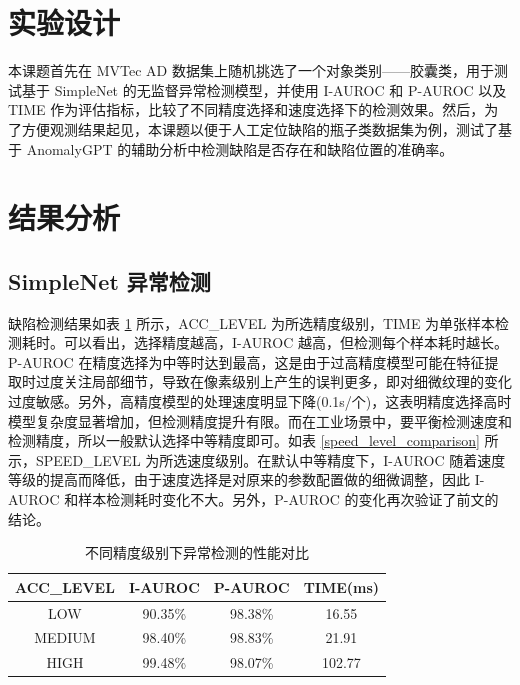 \documentclass[
  ]{njuthesis}
\begin{document}
\section{实验设计}

本课题首先在 MVTec AD 数据集上随机挑选了一个对象类别——胶囊类，用于测试基于 SimpleNet 的无监督异常检测模型，并使用 I-AUROC 和 P-AUROC 以及 TIME 作为评估指标，比较了不同精度选择和速度选择下的检测效果。然后，为了方便观测结果起见，本课题以便于人工定位缺陷的瓶子类数据集为例，测试了基于 AnomalyGPT 的辅助分析中检测缺陷是否存在和缺陷位置的准确率。

\section{结果分析}

\subsection{SimpleNet 异常检测}

缺陷检测结果如表 \ref{acc_level_comparison} 所示，ACC\_LEVEL 为所选精度级别，TIME 为单张样本检测耗时。可以看出，选择精度越高，I-AUROC 越高，但检测每个样本耗时越长。P-AUROC 在精度选择为中等时达到最高，这是由于过高精度模型可能在特征提取时过度关注局部细节，导致在像素级别上产生的误判更多，即对细微纹理的变化过度敏感。另外，高精度模型的处理速度明显下降(0.1s/个)，这表明精度选择高时模型复杂度显著增加，但检测精度提升有限。而在工业场景中，要平衡检测速度和检测精度，所以一般默认选择中等精度即可。如表 \ref{speed_level_comparison} 所示，SPEED\_LEVEL 为所选速度级别。在默认中等精度下，I-AUROC 随着速度等级的提高而降低，由于速度选择是对原来的参数配置做的细微调整，因此 I-AUROC 和样本检测耗时变化不大。另外，P-AUROC 的变化再次验证了前文的结论。

\begin{table}[H]
    \centering
    \caption{不同精度级别下异常检测的性能对比}
    \label{acc_level_comparison}
    \renewcommand\arraystretch{0.8}
    \begin{tabular}{cccc}
    \toprule
    ACC\_LEVEL & I-AUROC & P-AUROC & TIME(ms) \\
    \midrule
    LOW & 90.35\% & 98.38\% & 16.55 \\
    MEDIUM & 98.40\% & 98.83\% & 21.91 \\
    HIGH & 99.48\% & 98.07\% & 102.77 \\
    \bottomrule
    \end{tabular}
\end{table}
\end{document}
